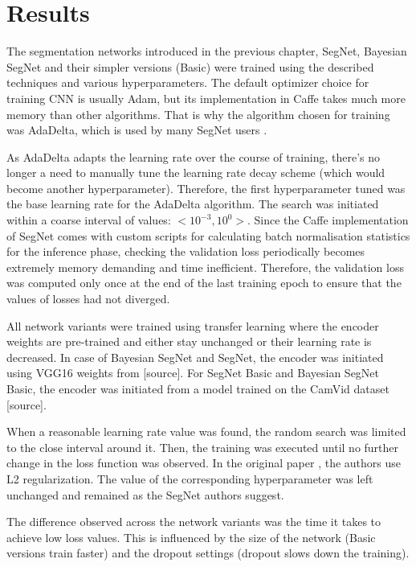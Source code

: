 \chapter{Results}

The segmentation networks introduced in the previous chapter, SegNet, Bayesian SegNet and their simpler versions (Basic) were trained using the described techniques and various hyperparameters. The default optimizer choice for training CNN is usually Adam, but its implementation in Caffe takes much more memory than other algorithms. That is why the algorithm chosen for training was AdaDelta, which is used by many SegNet users \cite{aizawan_github}.

As AdaDelta adapts the learning rate over the course of training, there's no longer a need to manually tune the learning rate decay scheme (which would become another hyperparameter). Therefore, the first hyperparameter tuned was the base learning rate for the AdaDelta algorithm. The search was initiated within a coarse interval of values: $ <10^{-3}, 10^{0}>  $. Since the Caffe implementation of SegNet comes with custom scripts for calculating batch normalisation statistics for the inference phase, checking the validation loss periodically becomes extremely memory demanding and time inefficient. Therefore, the validation loss was computed only once at the end of the last training epoch to ensure that the values of losses had not diverged.  

All network variants were trained using transfer learning where the encoder weights are pre-trained and either stay unchanged or their learning rate is decreased. In case of Bayesian SegNet and SegNet, the encoder was initiated using VGG16 weights from [source]. For SegNet Basic and Bayesian SegNet Basic, the encoder was initiated from a model trained on the CamVid dataset [source]. 

When a reasonable learning rate value was found, the random search was limited to the close interval around it. Then, the training was executed until no further change in the loss function was observed. In the original paper \cite{segnet}, the authors use L2 regularization. The value of the corresponding hyperparameter was left unchanged and remained as the SegNet authors suggest.  

The difference observed across the network variants was the time it takes to achieve low loss values. This is influenced by the size of the network (Basic versions train faster) and the dropout settings (dropout slows down the training).


